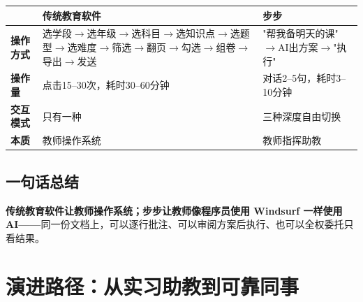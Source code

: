 \documentclass[11pt,a4paper]{article}
\begin{document}
\begin{center}\small
\begin{tabularx}{\textwidth}{>{\bfseries}l Y Y}
\toprule
{} & \textbf{传统教育软件} & \textbf{步步} \\
\midrule
操作方式 & 选学段$\rightarrow$选年级$\rightarrow$选科目$\rightarrow$选知识点$\rightarrow$选题型$\rightarrow$选难度$\rightarrow$筛选$\rightarrow$翻页$\rightarrow$勾选$\rightarrow$组卷$\rightarrow$导出$\rightarrow$发送 & "帮我备明天的课"$\rightarrow$AI出方案$\rightarrow$"执行" \\
操作量 & 点击15--30次，耗时30--60分钟 & 对话2--5句，耗时3--10分钟 \\
交互模式 & 只有一种 & 三种深度自由切换 \\
本质 & 教师操作系统 & 教师指挥助教 \\
\bottomrule
\end{tabularx}
\end{center}

\subsection{一句话总结}

\begin{notebox}
\textbf{传统教育软件让教师操作系统；步步让教师像程序员使用 Windsurf 一样使用 AI——}同一份文档上，可以逐行批注、可以审阅方案后执行、也可以全权委托只看结果。
\end{notebox}

\section{演进路径：从实习助教到可靠同事}
\end{document}
